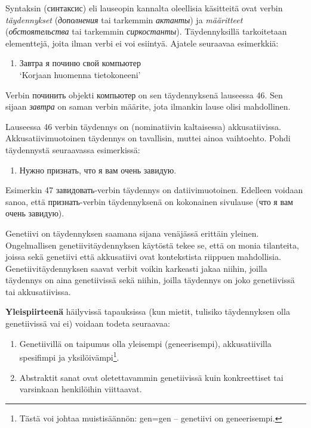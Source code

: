 \documentclass[]{scrreprt}
\providecommand{\tightlist}{%
  \setlength{\itemsep}{0pt}\setlength{\parskip}{0pt}}
\begin{document}
Syntaksin (синтаксис) eli lauseopin kannalta oleellisia käsitteitä ovat
verbin \emph{täydennykset} (\emph{дополнения} tai tarkemmin
\emph{актанты}) ja \emph{määritteet} (\emph{обстоятельства} tai
tarkemmin \emph{сиркостанты}). Täydennyksillä tarkoitetaan elementtejä,
joita ilman verbi ei voi esiintyä. Ajatele seuraavaa esimerkkiä:

\begin{enumerate}
\def\labelenumi{(\arabic{enumi})}
\setcounter{enumi}{45}
\tightlist
\item
  Завтра я починю свой компьютер\\
   `Korjaan huomenna tietokoneeni'
\end{enumerate}

Verbin починить objekti компьютер on sen täydennyksenä lauseessa 46. Sen
sijaan \emph{завтра} on saman verbin määrite, jota ilmankin lause olisi
mahdollinen.

Lauseessa 46 verbin täydennys on (nominatiivin kaltaisessa)
akkusatiivissa. Akkusatiivimuotoinen täydennys on tavallisin, muttei
ainoa vaihtoehto. Pohdi täydennystä seuraavassa esimerkissä:

\begin{enumerate}
\def\labelenumi{(\arabic{enumi})}
\setcounter{enumi}{46}
\tightlist
\item
  Нужно признать, что я вам очень завидую.
\end{enumerate}

Esimerkin 47 завидовать-verbin täydennys on datiivimuotoinen. Edelleen
voidaan sanoa, että признать-verbin täydennyksenä on kokonainen
sivulause (что я вам очень завидую).

Genetiivi on täydennyksen saamana sijana venäjässä erittäin yleinen.
Ongelmallisen genetiivitäydennyksen käytöstä tekee se, että on monia
tilanteita, joissa sekä genetiivi että akkusatiivi ovat kontekstista
riippuen mahdollisia. Genetiivitäydennyksen saavat verbit voikin
karkeasti jakaa niihin, joilla täydennys on aina genetiivissä sekä
niihin, joilla täydennys on joko genetiivissä tai akkusatiivissa.

\textbf{Yleispiirteenä} häilyvissä tapauksissa (kun mietit, tulisiko
täydennyksen olla genetiivissä vai ei) voidaan todeta seuraavaa:

\begin{enumerate}
\def\labelenumi{\arabic{enumi}.}
\tightlist
\item
  Genetiivillä on taipumus olla yleisempi (geneerisempi), akkusatiivilla
  spesifimpi ja yksilöivämpi\footnote{Tästä voi johtaa muistisäännön:
    gen=gen -- genetiivi on geneerisempi.}.
\item
  Abstraktit sanat ovat oletettavammin genetiivissä kuin konkreettiset
  tai varsinkaan henkilöihin viittaavat.
\end{enumerate}
\end{document}
